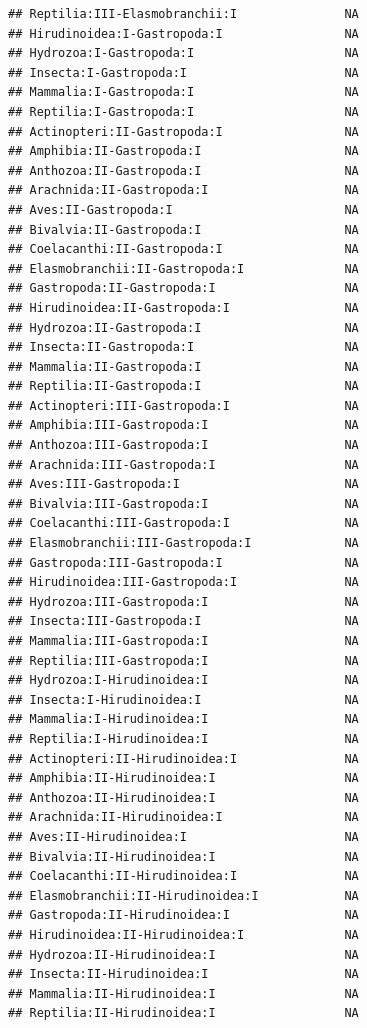 \documentclass[
  12pt,
]{article}
\begin{document}
\begin{verbatim}
## Reptilia:III-Elasmobranchii:I               NA
## Hirudinoidea:I-Gastropoda:I                 NA
## Hydrozoa:I-Gastropoda:I                     NA
## Insecta:I-Gastropoda:I                      NA
## Mammalia:I-Gastropoda:I                     NA
## Reptilia:I-Gastropoda:I                     NA
## Actinopteri:II-Gastropoda:I                 NA
## Amphibia:II-Gastropoda:I                    NA
## Anthozoa:II-Gastropoda:I                    NA
## Arachnida:II-Gastropoda:I                   NA
## Aves:II-Gastropoda:I                        NA
## Bivalvia:II-Gastropoda:I                    NA
## Coelacanthi:II-Gastropoda:I                 NA
## Elasmobranchii:II-Gastropoda:I              NA
## Gastropoda:II-Gastropoda:I                  NA
## Hirudinoidea:II-Gastropoda:I                NA
## Hydrozoa:II-Gastropoda:I                    NA
## Insecta:II-Gastropoda:I                     NA
## Mammalia:II-Gastropoda:I                    NA
## Reptilia:II-Gastropoda:I                    NA
## Actinopteri:III-Gastropoda:I                NA
## Amphibia:III-Gastropoda:I                   NA
## Anthozoa:III-Gastropoda:I                   NA
## Arachnida:III-Gastropoda:I                  NA
## Aves:III-Gastropoda:I                       NA
## Bivalvia:III-Gastropoda:I                   NA
## Coelacanthi:III-Gastropoda:I                NA
## Elasmobranchii:III-Gastropoda:I             NA
## Gastropoda:III-Gastropoda:I                 NA
## Hirudinoidea:III-Gastropoda:I               NA
## Hydrozoa:III-Gastropoda:I                   NA
## Insecta:III-Gastropoda:I                    NA
## Mammalia:III-Gastropoda:I                   NA
## Reptilia:III-Gastropoda:I                   NA
## Hydrozoa:I-Hirudinoidea:I                   NA
## Insecta:I-Hirudinoidea:I                    NA
## Mammalia:I-Hirudinoidea:I                   NA
## Reptilia:I-Hirudinoidea:I                   NA
## Actinopteri:II-Hirudinoidea:I               NA
## Amphibia:II-Hirudinoidea:I                  NA
## Anthozoa:II-Hirudinoidea:I                  NA
## Arachnida:II-Hirudinoidea:I                 NA
## Aves:II-Hirudinoidea:I                      NA
## Bivalvia:II-Hirudinoidea:I                  NA
## Coelacanthi:II-Hirudinoidea:I               NA
## Elasmobranchii:II-Hirudinoidea:I            NA
## Gastropoda:II-Hirudinoidea:I                NA
## Hirudinoidea:II-Hirudinoidea:I              NA
## Hydrozoa:II-Hirudinoidea:I                  NA
## Insecta:II-Hirudinoidea:I                   NA
## Mammalia:II-Hirudinoidea:I                  NA
## Reptilia:II-Hirudinoidea:I                  NA

\end{verbatim}
\end{document}
